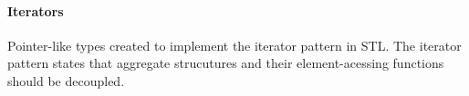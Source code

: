 \documentclass[10pt]{article}
\begin{document}
\footnotesize
\begin{multicols*}{5}
\paragraph{Iterators}	
Pointer-like types created to implement the iterator pattern in STL. The iterator pattern states that aggregate strucutures and their element-acessing functions should be decoupled.  



\end{multicols*}
\end{document}
